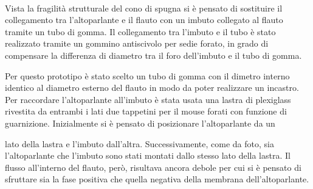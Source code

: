 \begin{figure}
\centering
{} \\
\end{figure}

Vista la fragilità strutturale del cono di spugna si è pensato di sostituire il
collegamento tra l’altoparlante e il flauto con un imbuto collegato al flauto tramite un tubo di gomma.  Il collegamento tra l’imbuto e il tubo è stato
realizzato tramite un gommino antiscivolo per sedie forato, in grado di compensare la differenza di diametro tra il foro dell’imbuto e il tubo di gomma.

Per questo prototipo è stato scelto un tubo di gomma con il dimetro interno identico al diametro esterno del flauto in modo da poter realizzare un incastro.
Per raccordare l’altoparlante all’imbuto è stata usata una lastra di plexiglass rivestita da entrambi i lati due tappetini per il mouse forati con funzione di guarnizione. Inizialmente si è pensato di posizionare l’altoparlante da un

lato della lastra e l’imbuto dall’altra. Successivamente, come da foto, sia l’altoparlante che l’imbuto sono stati montati dallo stesso lato della lastra.
Il flusso all’interno del flauto, però, risultava ancora debole per cui si è pensato di sfruttare sia la fase positiva che quella negativa della membrana dell’altoparlante.

